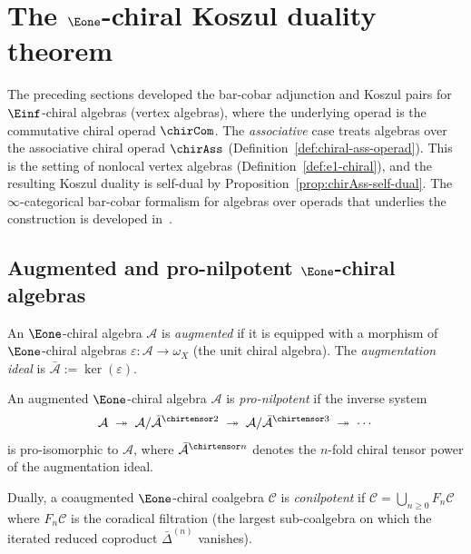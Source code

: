 \section{\texorpdfstring{The $\Eone$-chiral Koszul duality theorem}{The E1-chiral Koszul duality theorem}}

The preceding sections developed the bar-cobar adjunction and Koszul
pairs for $\Einf$-chiral algebras (vertex algebras), where the
underlying operad is the commutative chiral operad $\chirCom$.
The \emph{associative} case treats algebras over the
associative chiral operad $\chirAss$
(Definition~\ref{def:chiral-ass-operad}).  This is the
setting of nonlocal vertex algebras
(Definition~\ref{def:e1-chiral}), and the resulting Koszul duality
is self-dual by Proposition~\ref{prop:chirAss-self-dual}.
The $\infty$-categorical bar-cobar formalism for algebras over operads
that underlies the construction is developed in~\cite[§3.1]{HA}.

\subsection{\texorpdfstring{Augmented and pro-nilpotent $\Eone$-chiral algebras}{Augmented and pro-nilpotent E1-chiral algebras}}

\begin{definition}
\label{def:augmented-e1}
An $\Eone$-chiral algebra $\mathcal{A}$ is \emph{augmented} if it
is equipped with a morphism of $\Eone$-chiral algebras
$\varepsilon: \mathcal{A} \to \omega_X$ (the unit chiral algebra).
The \emph{augmentation ideal} is
$\bar{\mathcal{A}} := \ker(\varepsilon)$.
\end{definition}

\begin{definition}
\label{def:pronilpotent-conilpotent}
An augmented $\Eone$-chiral algebra $\mathcal{A}$ is
\emph{pro-nilpotent} if the inverse system
\[
\mathcal{A} \;\twoheadrightarrow\;
\mathcal{A}/\bar{\mathcal{A}}^{\chirtensor 2} \;\twoheadrightarrow\;
\mathcal{A}/\bar{\mathcal{A}}^{\chirtensor 3} \;\twoheadrightarrow\;
\cdots
\]
is pro-isomorphic to $\mathcal{A}$, where
$\bar{\mathcal{A}}^{\chirtensor n}$ denotes the $n$-fold chiral
tensor power of the augmentation ideal.

Dually, a coaugmented $\Eone$-chiral coalgebra $\mathcal{C}$ is
\emph{conilpotent} if
$\mathcal{C} = \bigcup_{n \geq 0} F_n\mathcal{C}$
where $F_n\mathcal{C}$ is the coradical filtration
(the largest sub-coalgebra on which the iterated reduced coproduct
$\bar{\Delta}^{(n)}$ vanishes).
\end{definition}

